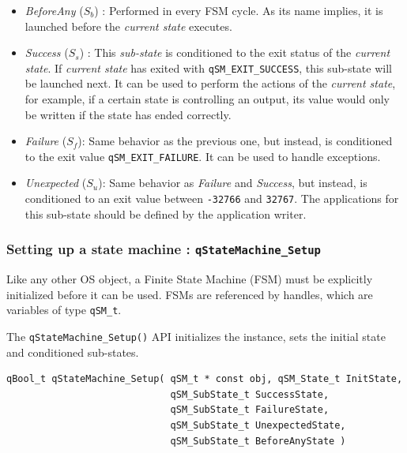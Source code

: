 \documentclass{article}
\begin{document}
\begin{itemize}
    \item \textit{BeforeAny} ($S_b$) : Performed in every FSM cycle. As its name implies, it is launched before the \textit{current state} executes. 
    
    \item \textit{Success} ($S_s$) : This \textit{sub-state} is conditioned to the exit status of the \textit{current state}. If \textit{current state} has exited with  \lstinline{qSM_EXIT_SUCCESS}, this sub-state will be launched next. It can be used to perform the actions of the \textit{current state}, for example, if a certain state is controlling an output, its value would only be written if the state has ended correctly.
    
    \item \textit{Failure} ($S_f$): Same behavior as the previous one, but instead, is conditioned to the exit value \lstinline{qSM_EXIT_FAILURE}. It can be used to handle exceptions.
    
    \item \textit{Unexpected} ($S_u$): Same behavior as \textit{Failure} and \textit{Success}, but instead, is conditioned to an exit value between \lstinline{-32766} and \lstinline{32767}. The applications for this sub-state should be defined by the application writer.
\end{itemize}


\subsubsection{Setting up a state machine : \lstinline{qStateMachine_Setup} }
Like any other OS object, a Finite State Machine (FSM) must be explicitly initialized before it can be used. FSMs are referenced by handles, which are variables of type \lstinline{qSM_t}. 

The \lstinline{qStateMachine_Setup()} API   initializes the instance, sets the initial state and conditioned sub-states.\\


\begin{lstlisting}[style=CStyle]
qBool_t qStateMachine_Setup( qSM_t * const obj, qSM_State_t InitState,
                             qSM_SubState_t SuccessState, 
                             qSM_SubState_t FailureState, 
                             qSM_SubState_t UnexpectedState, 
                             qSM_SubState_t BeforeAnyState )
\end{lstlisting}
\end{document}
